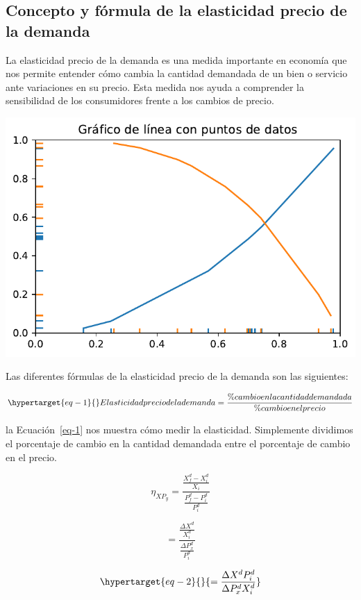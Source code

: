 \documentclass[
  a4paper,
]{article}
\begin{document}
\hypertarget{concepto-y-fuxf3rmula-de-la-elasticidad-precio-de-la-demanda}{%
\subsection{Concepto y fórmula de la elasticidad precio de la
demanda}\label{concepto-y-fuxf3rmula-de-la-elasticidad-precio-de-la-demanda}}

La elasticidad precio de la demanda es una medida importante en economía
que nos permite entender cómo cambia la cantidad demandada de un bien o
servicio ante variaciones en su precio. Esta medida nos ayuda a
comprender la sensibilidad de los consumidores frente a los cambios de
precio.

\includegraphics{index_files/figure-pdf/cell-2-output-1.pdf}

Las diferentes fórmulas de la elasticidad precio de la demanda son las
siguientes:

\begin{equation}\protect\hypertarget{eq-1}{}{
Elasticidad precio de la demanda =\frac{\% cambio en la cantidad demandada}{\% cambio en el precio}
}\label{eq-1}\end{equation}

la Ecuación~\ref{eq-1} nos muestra cómo medir la elasticidad.
Simplemente dividimos el porcentaje de cambio en la cantidad demandada
entre el porcentaje de cambio en el precio.

\[
\eta _{XP_y} = \frac{\frac {X_f^d - X_i^d}{X_i}}{\frac {P_f^d - P_i^d}{P_i^d}}
\]

\[
= \frac{\frac{\Delta X^d}{X_i^d}}{\frac{\Delta P_x^d}{P_i^d}}
\]

\begin{equation}\protect\hypertarget{eq-2}{}{
= \frac{\Delta X^d P_i^d}{\Delta P_x^d X_i^d}
}\label{eq-2}\end{equation}
\end{document}
